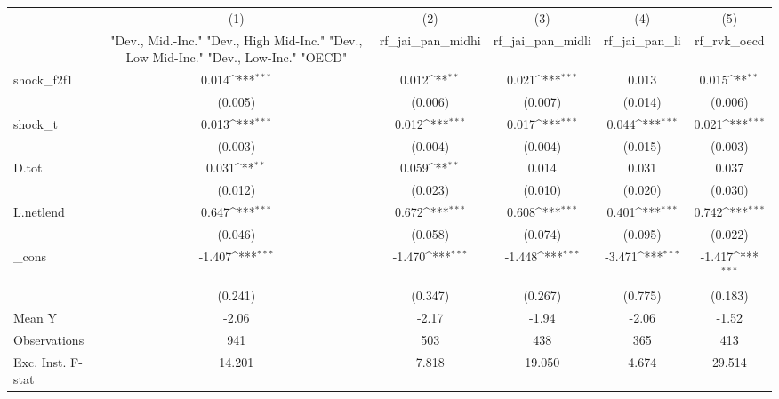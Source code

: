 {
\def\sym#1{\ifmmode^{#1}\else\(^{#1}\)\fi}
\begin{tabular}{l*{5}{c}}
\toprule
            &\multicolumn{1}{c}{(1)}&\multicolumn{1}{c}{(2)}&\multicolumn{1}{c}{(3)}&\multicolumn{1}{c}{(4)}&\multicolumn{1}{c}{(5)}\\
            &\multicolumn{1}{c}{ "Dev., Mid.-Inc." "Dev., High Mid-Inc." "Dev., Low Mid-Inc." "Dev., Low-Inc." "OECD" }&\multicolumn{1}{c}{rf\_jai\_pan\_midhi}&\multicolumn{1}{c}{rf\_jai\_pan\_midli}&\multicolumn{1}{c}{rf\_jai\_pan\_li}&\multicolumn{1}{c}{rf\_rvk\_oecd}\\
\midrule
shock\_f2f1  &       0.014\sym{***}&       0.012\sym{**} &       0.021\sym{***}&       0.013         &       0.015\sym{**} \\
            &     (0.005)         &     (0.006)         &     (0.007)         &     (0.014)         &     (0.006)         \\
\addlinespace
shock\_t     &       0.013\sym{***}&       0.012\sym{***}&       0.017\sym{***}&       0.044\sym{***}&       0.021\sym{***}\\
            &     (0.003)         &     (0.004)         &     (0.004)         &     (0.015)         &     (0.003)         \\
\addlinespace
D.tot       &       0.031\sym{**} &       0.059\sym{**} &       0.014         &       0.031         &       0.037         \\
            &     (0.012)         &     (0.023)         &     (0.010)         &     (0.020)         &     (0.030)         \\
\addlinespace
L.netlend   &       0.647\sym{***}&       0.672\sym{***}&       0.608\sym{***}&       0.401\sym{***}&       0.742\sym{***}\\
            &     (0.046)         &     (0.058)         &     (0.074)         &     (0.095)         &     (0.022)         \\
\addlinespace
\_cons      &      -1.407\sym{***}&      -1.470\sym{***}&      -1.448\sym{***}&      -3.471\sym{***}&      -1.417\sym{***}\\
            &     (0.241)         &     (0.347)         &     (0.267)         &     (0.775)         &     (0.183)         \\
\midrule
Mean Y      &       -2.06         &       -2.17         &       -1.94         &       -2.06         &       -1.52         \\
Observations&         941         &         503         &         438         &         365         &         413         \\
Exc. Inst. F-stat&      14.201         &       7.818         &      19.050         &       4.674         &      29.514         \\
\bottomrule
\end{tabular}
}
